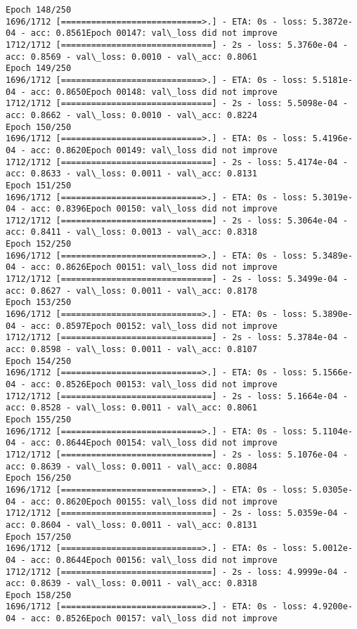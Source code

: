 \documentclass[11pt]{article}
\begin{document}
\begin{Verbatim}[commandchars=\\\{\}]
Epoch 148/250
1696/1712 [============================>.] - ETA: 0s - loss: 5.3872e-04 - acc: 0.8561Epoch 00147: val\_loss did not improve
1712/1712 [==============================] - 2s - loss: 5.3760e-04 - acc: 0.8569 - val\_loss: 0.0010 - val\_acc: 0.8061
Epoch 149/250
1696/1712 [============================>.] - ETA: 0s - loss: 5.5181e-04 - acc: 0.8650Epoch 00148: val\_loss did not improve
1712/1712 [==============================] - 2s - loss: 5.5098e-04 - acc: 0.8662 - val\_loss: 0.0010 - val\_acc: 0.8224
Epoch 150/250
1696/1712 [============================>.] - ETA: 0s - loss: 5.4196e-04 - acc: 0.8620Epoch 00149: val\_loss did not improve
1712/1712 [==============================] - 2s - loss: 5.4174e-04 - acc: 0.8633 - val\_loss: 0.0011 - val\_acc: 0.8131
Epoch 151/250
1696/1712 [============================>.] - ETA: 0s - loss: 5.3019e-04 - acc: 0.8396Epoch 00150: val\_loss did not improve
1712/1712 [==============================] - 2s - loss: 5.3064e-04 - acc: 0.8411 - val\_loss: 0.0013 - val\_acc: 0.8318
Epoch 152/250
1696/1712 [============================>.] - ETA: 0s - loss: 5.3489e-04 - acc: 0.8626Epoch 00151: val\_loss did not improve
1712/1712 [==============================] - 2s - loss: 5.3499e-04 - acc: 0.8627 - val\_loss: 0.0011 - val\_acc: 0.8178
Epoch 153/250
1696/1712 [============================>.] - ETA: 0s - loss: 5.3890e-04 - acc: 0.8597Epoch 00152: val\_loss did not improve
1712/1712 [==============================] - 2s - loss: 5.3784e-04 - acc: 0.8598 - val\_loss: 0.0011 - val\_acc: 0.8107
Epoch 154/250
1696/1712 [============================>.] - ETA: 0s - loss: 5.1566e-04 - acc: 0.8526Epoch 00153: val\_loss did not improve
1712/1712 [==============================] - 2s - loss: 5.1664e-04 - acc: 0.8528 - val\_loss: 0.0011 - val\_acc: 0.8061
Epoch 155/250
1696/1712 [============================>.] - ETA: 0s - loss: 5.1104e-04 - acc: 0.8644Epoch 00154: val\_loss did not improve
1712/1712 [==============================] - 2s - loss: 5.1076e-04 - acc: 0.8639 - val\_loss: 0.0011 - val\_acc: 0.8084
Epoch 156/250
1696/1712 [============================>.] - ETA: 0s - loss: 5.0305e-04 - acc: 0.8620Epoch 00155: val\_loss did not improve
1712/1712 [==============================] - 2s - loss: 5.0359e-04 - acc: 0.8604 - val\_loss: 0.0011 - val\_acc: 0.8131
Epoch 157/250
1696/1712 [============================>.] - ETA: 0s - loss: 5.0012e-04 - acc: 0.8644Epoch 00156: val\_loss did not improve
1712/1712 [==============================] - 2s - loss: 4.9999e-04 - acc: 0.8639 - val\_loss: 0.0011 - val\_acc: 0.8318
Epoch 158/250
1696/1712 [============================>.] - ETA: 0s - loss: 4.9200e-04 - acc: 0.8526Epoch 00157: val\_loss did not improve

\end{Verbatim}
\end{document}

